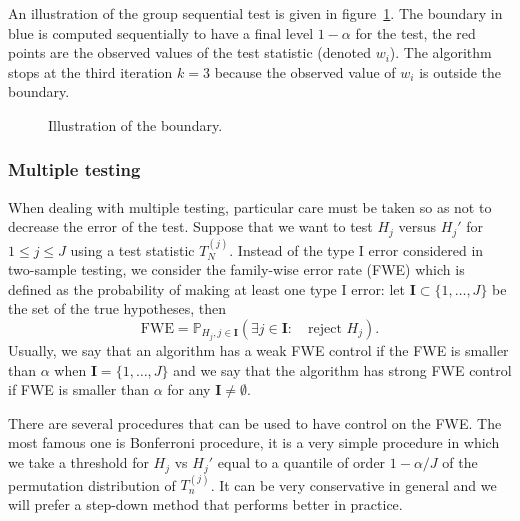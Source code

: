 \documentclass{article}
\theoremstyle{plain}
\theoremstyle{remark}
\renewcommand{\P}{\mathbb{P}}
\newcommand{\1}{\mathbbm{1}}
\numberwithin{equation}{section}
\begin{document}
An illustration of the group sequential test is given in figure~\ref{fig:gst}. The boundary in blue is computed sequentially to have a final level $1-\alpha$ for the test, the red points are the observed values of the test statistic (denoted $w_i$). The algorithm stops at the third iteration $k=3$ because the observed value of $w_i$ is outside the boundary.

\begin{figure}
\begin{center}

\caption{Illustration of the boundary.\label{fig:gst}}
\end{center}
\end{figure}



\subsubsection{Multiple testing}
When dealing with multiple testing, particular care must be taken so as not to decrease the error of the test. Suppose that we want to test $H_j$ versus $H_j'$ for $1\le j\le J$ using a test statistic $T_{N}^{(j)}$. Instead of the type I error considered in two-sample testing, we consider the family-wise error rate (FWE) which is defined as the probability of making at least one type I error: let $\textbf{I}\subset \{1,\dots,J\}$ be the set of the true hypotheses, then 
$$\mathrm{FWE} = \P_{H_j, j \in \textbf{I}}\left(\exists j \in \textbf{I}:\quad  \text{reject }H_j \right).$$
Usually, we say that an algorithm has a weak FWE control if the FWE is smaller than $\alpha$ when $\textbf{I}=\{1,\dots,J\}$ and we say that the algorithm has strong FWE control if FWE is smaller than $\alpha$ for any $\textbf{I}\neq \emptyset$.

There are several procedures that can be used to have control on the FWE. The most famous one is Bonferroni procedure, it is a very simple procedure in which we take a threshold for $H_j$ vs $H_j'$ equal to a quantile of order $1-\alpha/J$ of the permutation distribution of $T_n^{(j)}$. It can be very conservative in general and we will prefer a step-down method that performs better in practice.
\end{document}
